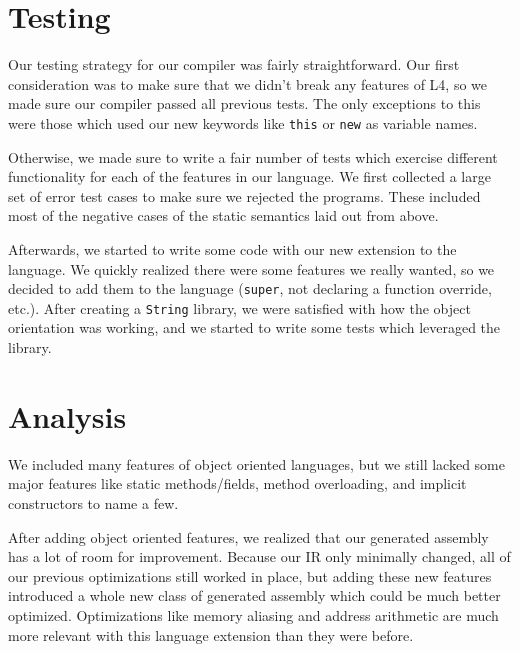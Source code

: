 \documentclass{article}
\begin{document}
\section{Testing}

Our testing strategy for our compiler was fairly straightforward. Our first
consideration was to make sure that we didn't break any features of L4, so we
made sure our compiler passed all previous tests. The only exceptions to this
were those which used our new keywords like \texttt{this} or \texttt{new} as
variable names.

Otherwise, we made sure to write a fair number of tests which exercise different
functionality for each of the features in our language. We first collected a
large set of error test cases to make sure we rejected the programs. These
included most of the negative cases of the static semantics laid out from
above.

Afterwards, we started to write some code with our new extension to the
language. We quickly realized there were some features we really wanted, so we
decided to add them to the language (\texttt{super}, not declaring a function
override, etc.). After creating a \texttt{String} library, we were satisfied
with how the object orientation was working, and we started to write some tests
which leveraged the library.

\section{Analysis}

We included many features of object oriented languages, but we still lacked some
major features like static methods/fields, method overloading, and implicit
constructors to name a few.

After adding object oriented features, we realized that our generated assembly
has a lot of room for improvement. Because our IR only minimally changed, all of
our previous optimizations still worked in place, but adding these new features
introduced a whole new class of generated assembly which could be much better
optimized. Optimizations like memory aliasing and address arithmetic are much
more relevant with this language extension than they were before.
\end{document}

